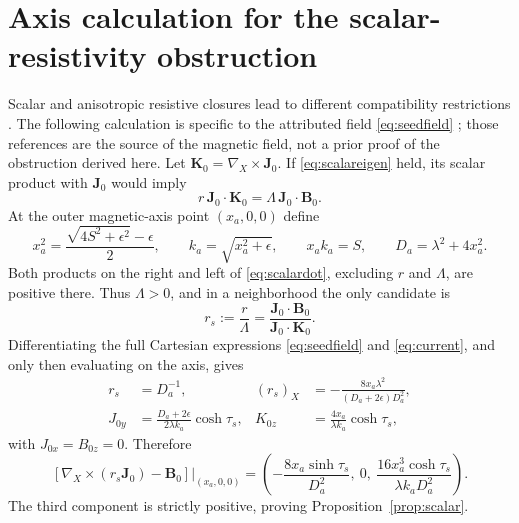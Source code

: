 \documentclass[11pt,a4paper]{article}
\theoremstyle{remark}\newtheorem{remark}{Remark}
\numberwithin{equation}{section}
\newcommand{\BB}{\boldsymbol B}
\newcommand{\JJ}{\boldsymbol J}
\newcommand{\grad}{\nabla}
\begin{document}
\section{Axis calculation for the scalar-resistivity obstruction}\label{app:scalar}
Scalar and anisotropic resistive closures lead to different compatibility restrictions \citep{Poulipoulis,Montani}. The following calculation is specific to the attributed field \eqref{eq:seedfield} \citep{Landreman,Issan}; those references are the source of the magnetic field, not a prior proof of the obstruction derived here. Let $\boldsymbol K_0=\grad_X\!\times\JJ_0$. If \eqref{eq:scalareigen} held, its scalar product with $\JJ_0$ would imply
\begin{equation}
r\,\JJ_0\cdot\boldsymbol K_0=\Lambda\,\JJ_0\cdot\BB_0.
\label{eq:scalardot}
\end{equation}
At the outer magnetic-axis point $(x_a,0,0)$ define
\begin{equation}
x_a^2=\frac{\sqrt{4S^2+\epsilon^2}-\epsilon}{2},\qquad
k_a=\sqrt{x_a^2+\epsilon},\qquad
x_ak_a=S,\qquad D_a=\lambda^2+4x_a^2.
\label{eq:axisparameters}
\end{equation}
Both products on the right and left of \eqref{eq:scalardot}, excluding $r$ and $\Lambda$, are positive there. Thus $\Lambda>0$, and in a neighborhood the only candidate is
\begin{equation}
r_s:=\frac r\Lambda
=\frac{\JJ_0\cdot\BB_0}{\JJ_0\cdot\boldsymbol K_0}.
\label{eq:uniquescalar}
\end{equation}
Differentiating the full Cartesian expressions \eqref{eq:seedfield} and \eqref{eq:current}, and only then evaluating on the axis, gives
\begin{equation}
\begin{aligned}
r_s&=D_a^{-1},&
(r_s)_X&=-\frac{8x_a\lambda^2}{(D_a+2\epsilon)D_a^2},\\
J_{0y}&=\frac{D_a+2\epsilon}{2\lambda k_a}\cosh\tau_s,&
K_{0z}&=\frac{4x_a}{\lambda k_a}\cosh\tau_s,
\end{aligned}
\label{eq:axisderivatives}
\end{equation}
with $J_{0x}=B_{0z}=0$. Therefore
\begin{equation}
\left.\left[\grad_X\!\times(r_s\JJ_0)-\BB_0\right]\right|_{(x_a,0,0)}
=\left(-\frac{8x_a\sinh\tau_s}{D_a^2},\ 0,\
\frac{16x_a^3\cosh\tau_s}{\lambda k_aD_a^2}\right).
\label{eq:fullaxisresidual}
\end{equation}
The third component is strictly positive, proving Proposition~\ref{prop:scalar}.
\end{document}
